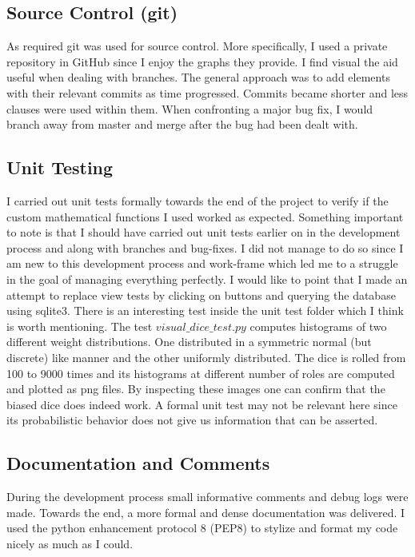 \documentclass[11pt]{article}
\begin{document}
\subsection{Source Control (git)}
 As required git was used for source control. More specifically, I used a private repository in GitHub since I enjoy the graphs they provide. I find visual the aid useful when dealing with branches.
 \newline
 The general approach was to add elements with their relevant commits as time progressed. Commits became shorter and less clauses were used within them. When confronting a major bug fix, I would branch away from master and merge after the bug had been dealt with.

\subsection{Unit Testing}
I carried out unit tests formally towards the end of the project to verify if the custom mathematical functions I used worked as expected. Something important to note is that I should have carried out unit tests earlier on in the development process and along with branches and bug-fixes. I did not manage to do so since I am new to this development process and work-frame which led me to a struggle in the goal of managing everything perfectly.
\newline
 I would like to point that I made an attempt to replace view tests by clicking on buttons and querying the database using sqlite3.
\newline
There is an interesting test inside the unit test folder which I think is worth mentioning. The test $visual\_dice\_test.py$ computes histograms
of two different weight distributions. One distributed in a symmetric normal (but discrete) like manner and the other uniformly distributed.
The dice is rolled from 100 to 9000 times and its histograms at different number of roles are computed and plotted as png files. By inspecting these images one can confirm that the biased dice does indeed work. A formal unit test may not be relevant here since its probabilistic behavior does not give us information that can be asserted.  

\subsection{Documentation and Comments}
During the development process small informative comments and debug logs were made. Towards the end, a more formal and dense documentation was delivered. I used the python enhancement protocol 8 (PEP8) to stylize and format my code nicely as much as I could.
\end{document}

